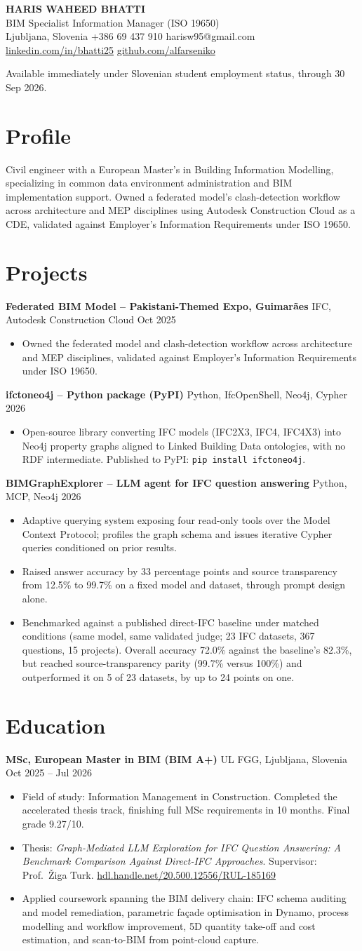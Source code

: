 \documentclass[a4paper,10.5pt]{article}
\newcommand{\datefill}{\dotfill}
\newcommand{\entry}[3]{\vspace{2.5pt}\noindent\textbf{#1} \textbar{} #2 \datefill{} #3\par\vspace{0.5pt}}
\newcommand{\ROLELINE}{BIM Specialist \textbar{} Information Manager (ISO 19650)}
\newcommand{\projIfcToNeo}{%
\entry{ifctoneo4j -- Python package (PyPI)}{Python, IfcOpenShell, Neo4j, Cypher}{2026}
\begin{itemize}
  \item Open-source library converting IFC models (IFC2X3, IFC4, IFC4X3) into Neo4j
        property graphs aligned to Linked Building Data ontologies, with no RDF
        intermediate. Published to PyPI: \texttt{pip install ifctoneo4j}.
\end{itemize}}
\newcommand{\projBIMGraph}{%
\entry{BIMGraphExplorer -- LLM agent for IFC question answering}{Python, MCP, Neo4j}{2026}
\begin{itemize}
  \item Adaptive querying system exposing four read-only tools over the Model
        Context Protocol; profiles the graph schema and issues iterative Cypher
        queries conditioned on prior results.
  \item Raised answer accuracy by 33 percentage points and source transparency from
        12.5\% to 99.7\% on a fixed model and dataset, through prompt design alone.
  \item Benchmarked against a published direct-IFC baseline under matched
        conditions (same model, same validated judge; 23 IFC datasets, 367
        questions, 15 projects). Overall accuracy 72.0\% against the baseline's
        82.3\%, but reached source-transparency parity (99.7\% versus 100\%) and
        outperformed it on 5 of 23 datasets, by up to 24 points on one.
\end{itemize}}
\newcommand{\projGuimaraes}{%
\entry{Federated BIM Model -- Pakistani-Themed Expo, Guimar\~aes}{IFC, Autodesk Construction Cloud}{Oct 2025}
\begin{itemize}
  \item Owned the federated model and clash-detection workflow across architecture
        and MEP disciplines, validated against Employer's Information Requirements
        under ISO 19650.
\end{itemize}}
\begin{document}
\begin{center}
  {\LARGE\bfseries HARIS WAHEED BHATTI}\\[2pt]
  {\large \ROLELINE}\\[3pt]
  Ljubljana, Slovenia \textbar{} +386 69 437 910 \textbar{} harisw95@gmail.com\\
  \href{https://linkedin.com/in/bhatti25}{linkedin.com/in/bhatti25} \textbar{}
  \href{https://github.com/alfarseniko}{github.com/alfarseniko}
\end{center}
\vspace{-4pt}
\noindent\small Available immediately under Slovenian student employment status, through
30 Sep 2026.\normalsize

\section{Profile}

\noindent Civil engineer with a European Master's in Building Information Modelling,
specializing in common data environment administration and BIM implementation
support. Owned a federated model's clash-detection workflow across architecture and
MEP disciplines using Autodesk Construction Cloud as a CDE, validated against
Employer's Information Requirements under ISO 19650.

\section{Projects}

 \projGuimaraes \projIfcToNeo \projBIMGraph

\section{Education}
\entry{MSc, European Master in BIM (BIM A+)}{UL FGG, Ljubljana, Slovenia}{Oct 2025 -- Jul 2026}
\begin{itemize}
  \item Field of study: Information Management in Construction. Completed the
        accelerated thesis track, finishing full MSc requirements in 10 months.
        Final grade 9.27/10.
  \item Thesis: \textit{Graph-Mediated LLM Exploration for IFC Question Answering:
        A Benchmark Comparison Against Direct-IFC Approaches}. Supervisor:
        Prof.~\v{Z}iga Turk. \href{http://hdl.handle.net/20.500.12556/RUL-185169}{hdl.handle.net/20.500.12556/RUL-185169}
  \item Applied coursework spanning the BIM delivery chain: IFC schema auditing and model remediation, parametric façade optimisation in Dynamo, process modelling and workflow improvement, 5D quantity take-off and cost estimation, and scan-to-BIM from point-cloud capture.
\end{itemize}
\end{document}
